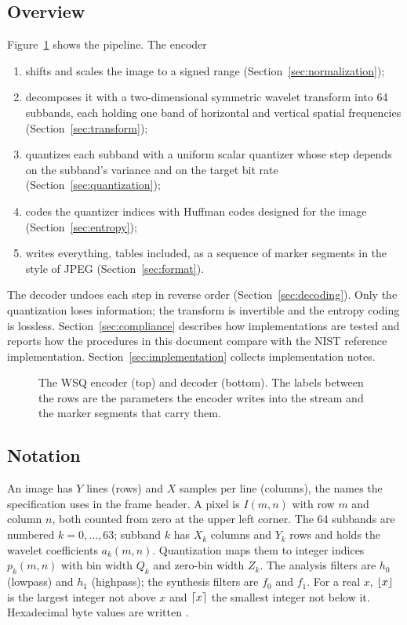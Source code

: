 \subsection{Overview}

Figure~\ref{fig:pipeline} shows the pipeline. The encoder
\begin{enumerate}
  \item shifts and scales the image to a signed range (Section~\ref{sec:normalization});
  \item decomposes it with a two-dimensional symmetric wavelet transform into 64 subbands, each
        holding one band of horizontal and vertical spatial frequencies
        (Section~\ref{sec:transform});
  \item quantizes each subband with a uniform scalar quantizer whose step depends on the
        subband's variance and on the target bit rate (Section~\ref{sec:quantization});
  \item codes the quantizer indices with Huffman codes designed for the image
        (Section~\ref{sec:entropy});
  \item writes everything, tables included, as a sequence of marker segments in the style of
        JPEG (Section~\ref{sec:format}).
\end{enumerate}
The decoder undoes each step in reverse order (Section~\ref{sec:decoding}). Only the
quantization loses information; the transform is invertible and the entropy coding is
lossless. Section~\ref{sec:compliance} describes how implementations are tested and reports
how the procedures in this document compare with the NIST reference implementation.
Section~\ref{sec:implementation} collects implementation notes.

\begin{figure}[ht]
  \centering
  
  \caption{The WSQ encoder (top) and decoder (bottom). The labels between the rows are the
  parameters the encoder writes into the stream and the marker segments that carry them.}
  \label{fig:pipeline}
\end{figure}

\subsection{Notation}

An image has $Y$ lines (rows) and $X$ samples per line (columns), the names the
specification uses in the frame header. A pixel is $I(m,n)$ with row $m$ and column $n$,
both counted from zero at the upper left corner. The 64 subbands are numbered
$k = 0,\dots,63$; subband $k$ has $X_k$ columns and $Y_k$ rows and holds the wavelet
coefficients $a_k(m,n)$. Quantization maps them to integer indices $p_k(m,n)$ with bin width
$Q_k$ and zero-bin width $Z_k$. The analysis filters are $h_0$ (lowpass) and $h_1$
(highpass); the synthesis filters are $f_0$ and $f_1$. For a real $x$, $\lfloor x \rfloor$ is the
largest integer not above $x$ and $\lceil x \rceil$ the smallest integer not below it. Hexadecimal
byte values are written .
